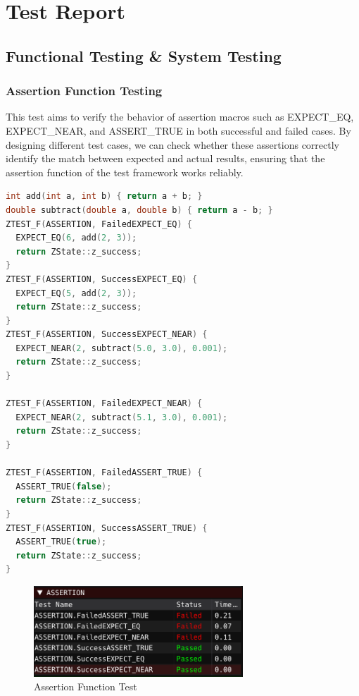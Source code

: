 \documentclass{article}
\begin{document}
\section{Test Report}
\subsection{Functional Testing \& System Testing}
\subsubsection{Assertion Function Testing}
This test aims to verify the behavior of assertion macros such as EXPECT\_EQ, EXPECT\_NEAR, and ASSERT\_TRUE in both successful and failed cases. By designing different test cases, we can check whether these assertions correctly identify the match between expected and actual results, ensuring that the assertion function of the test framework works reliably.
\begin{framed}
    \begin{lstlisting}[language=C++]
int add(int a, int b) { return a + b; }
double subtract(double a, double b) { return a - b; }
ZTEST_F(ASSERTION, FailedEXPECT_EQ) {
  EXPECT_EQ(6, add(2, 3));
  return ZState::z_success;
}
ZTEST_F(ASSERTION, SuccessEXPECT_EQ) {
  EXPECT_EQ(5, add(2, 3));
  return ZState::z_success;
}
ZTEST_F(ASSERTION, SuccessEXPECT_NEAR) {
  EXPECT_NEAR(2, subtract(5.0, 3.0), 0.001);
  return ZState::z_success;
}

ZTEST_F(ASSERTION, FailedEXPECT_NEAR) {
  EXPECT_NEAR(2, subtract(5.1, 3.0), 0.001);
  return ZState::z_success;
}

ZTEST_F(ASSERTION, FailedASSERT_TRUE) {
  ASSERT_TRUE(false);
  return ZState::z_success;
}
ZTEST_F(ASSERTION, SuccessASSERT_TRUE) {
  ASSERT_TRUE(true);
  return ZState::z_success;
}
\end{lstlisting}
\end{framed}
\begin{figure}[H]
    \centering
    \includegraphics[width=0.7\textwidth]{img/ass.png} %
    \caption{Assertion Function Test}
    \label{fig:assertion function test}
\end{figure}
\end{document}

